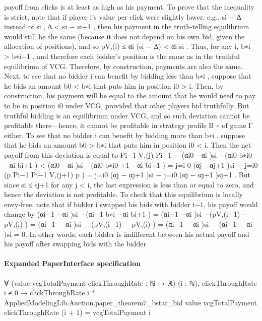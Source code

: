 \documentclass[10pt]{article}
\begin{document}
\begin{ReviewVerbatim}
payoff from clicks is at least as high as his payment. To prove that the inequality is strict, note
that if player i’s value per click were slightly lower, e.g., si − ∆ instead of si , ∆ < si − si+1 , then
his payment in the truth-telling equilibrium would still be the same (because it does not depend on
his own bid, given the allocation of positions), and so pV,(i) ≤ αi (si − ∆) < αi si . Thus, for any i,
b∗i > b∗i+1 , and therefore each bidder’s position is the same as in the truthful equilibrium of VCG.
Therefore, by construction, payments are also the same.
Next, to see that no bidder i can benefit by bidding less than b∗i , suppose that he bids an amount
b0 < b∗i that puts him in position i0 > i. Then, by construction, his payment will be equal to the
amount that he would need to pay to be in position i0 under VCG, provided that other players bid
truthfully. But truthful bidding is an equilibrium under VCG, and so such deviation cannot be
profitable there—hence, it cannot be profitable in strategy profile B ∗ of game Γ either.
To see that no bidder i can benefit by bidding more than b∗i , suppose that he bids an amount
b0 > b∗i that puts him in position i0 < i. Then the net payoff from this deviation is equal to
Pi−1 V,(j)
Pi−1
−
(αi0 −αi )si −(αi0 b∗i0 −αi bi+1 ) < (αi0 −αi )si −(αi0 b∗i0 +1 −αi bi+1 ) = j=i
0 (αj −αj+1 )si −
j=i0 (p
Pi−1
Pi−1
V,(j+1)
p
) = j=i0 (αj − αj+1 )si − j=i0 (αj − αj+1 )sj+1 . But since si ≤ sj+1 for any j < i, the last
expression is less than or equal to zero, and hence the deviation is not profitable.
To check that this equilibrium is locally envy-free, note that if bidder i swapped his bids with
bidder i−1, his payoff would change by (αi−1 −αi )si −(αi−1 b∗i −αi bi+1 ) = (αi−1 −αi )si −(pV,(i−1) −
pV,(i) ) = (αi−1 − αi )si − (pV,(i−1) − pV,(i) ) = (αi−1 − αi )si − (αi−1 − αi )si = 0. In other words, each
bidder is indifferent between his actual payoff and his payoff after swapping bids with the bidder
\end{ReviewVerbatim}



\paragraph{Expanded PaperInterface specification}
\begin{ReviewVerbatim}
∀ (value vcgTotalPayment clickThroughRate : ℕ → ℝ) (i : ℕ),
  clickThroughRate i ≠ 0 →
    clickThroughRate i *
        AppliedModelingLib.Auction.paper_theorem7_bstar_bid value vcgTotalPayment clickThroughRate (i + 1) =
      vcgTotalPayment i
\end{ReviewVerbatim}
\end{document}
